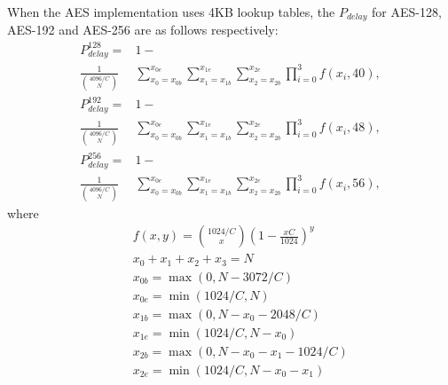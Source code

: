 When the AES implementation uses 4KB lookup tables, the $P_{delay}$ for AES-128, AES-192 and AES-256 are as follows respectively:
\begin{align}
    P_{delay}^{128} = &1-   \nonumber \\
    \frac{1}{\binom{4096/C}{N}}&\sum_{x_0=x_{0b}}^{x_{0e}}{\sum_{x_1=x_{1b}}^{x_{1e}}{\sum_{x_2=x_{2b}}^{x_{2e}}{\prod_{i=0}^{3}{f(x_i,40)}}}}, \nonumber
\end{align}
\begin{align}
    P_{delay}^{192} = &1-  \nonumber \\
    \frac{1}{\binom{4096/C}{N}}&\sum_{x_0=x_{0b}}^{x_{0e}}{\sum_{x_1=x_{1b}}^{x_{1e}}{\sum_{x_2=x_{2b}}^{x_{2e}}{\prod_{i=0}^{3}{f(x_i,48)}}}}, \nonumber
\end{align}
\begin{align}
    P_{delay}^{256} = &1-  \nonumber \\
    \frac{1}{\binom{4096/C}{N}}&\sum_{x_0=x_{0b}}^{x_{0e}}{\sum_{x_1=x_{1b}}^{x_{1e}}{\sum_{x_2=x_{2b}}^{x_{2e}}{\prod_{i=0}^{3}{f(x_i,56)}}}}, \nonumber
\end{align}
where
  \begin{eqnarray*}
    &&f(x,y) = \binom{1024/C}{x}(1-\frac{xC}{1024})^{y} \\
    &&x_0+x_1+x_2+x_3 = N \\
    &&x_{0b} = \max(0,N-3072/C) \\
    &&x_{0e} = \min(1024/C,N) \\
    &&x_{1b} = \max(0,N-x_0-2048/C) \\
    &&x_{1e} = \min(1024/C,N-x_0) \\
    &&x_{2b} = \max(0,N-x_0-x_1-1024/C) \\
    &&x_{2e} = \min(1024/C,N-x_0-x_1)
  \end{eqnarray*}

